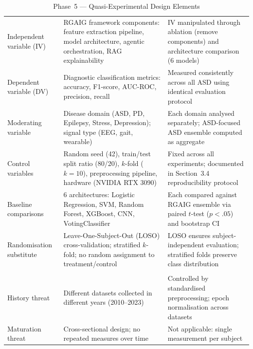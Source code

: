 \begin{xltabular}{\textwidth}{@{} p{0.16\textwidth} X X @{}}
\caption{Phase~5 --- Quasi-Experimental Design Elements}
\label{tab:phase5_quasi}\\
\toprule
{} &  &  \\
\midrule
\endfirsthead
\endhead
\bottomrule
\endlastfoot
Independent variable (IV)     & RGAIG framework components: feature extraction pipeline, model architecture, agentic orchestration, RAG explainability & IV manipulated through ablation (remove components) and architecture comparison (6 models) \\
\addlinespace
Dependent variable (DV)       & Diagnostic classification metrics: accuracy, F1-score, AUC-ROC, precision, recall & Measured consistently across all ASD using identical evaluation protocol \\
\addlinespace
Moderating variable           & Disease domain (ASD, PD, Epilepsy, Stress, Depression); signal type (EEG, gait, wearable) & Each domain analysed separately; ASD-focused ASD ensemble computed as aggregate \\
\addlinespace
Control variables             & Random seed (42), train/test split ratio (80/20), $k$-fold ($k = 10$), preprocessing pipeline, hardware (NVIDIA RTX 3090) & Fixed across all experiments; documented in Section~3.4 reproducibility protocol \\
\addlinespace
Baseline comparisons          & 6 architectures: Logistic Regression, SVM, Random Forest, XGBoost, CNN, VotingClassifier & Each compared against RGAIG ensemble via paired $t$-test ($p < .05$) and bootstrap CI \\
\addlinespace
Randomisation substitute      & Leave-One-Subject-Out (LOSO) cross-validation; stratified $k$-fold; no random assignment to treatment/control & LOSO ensures subject-independent evaluation; stratified folds preserve class distribution \\
\addlinespace
\midrule
{} \\
\midrule
History threat                & Different datasets collected in different years (2010--2023) & Controlled by standardised preprocessing; epoch normalisation across datasets \\
\addlinespace
Maturation threat             & Cross-sectional design; no repeated measures over time & Not applicable: single measurement per subject \\

\end{xltabular}
